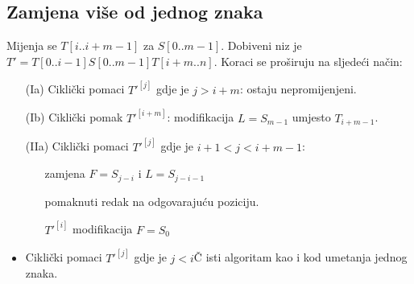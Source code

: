 \documentclass{ferseminar}
\begin{document}
\subsection{Zamjena više od jednog znaka}
Mijenja se $T[i..i+m-1]$ za $S[0..m-1]$. Dobiveni niz je $T'=T[0..i-1]S[0..m-1]T[i+m..n]$. Koraci se proširuju na sljedeći način:
\begin{itemize}
	\item[(Ia)] Ciklički pomaci $T'^{[j]}$ gdje je $j>i+m$: ostaju nepromijenjeni.
	\item[(Ib)] Ciklički pomak $T'^{[i+m]}$: modifikacija $L=S_{m-1}$ umjesto $T_{i+m-1}$.
	\item[(IIa)] Ciklički pomaci $T'^{[j]}$ gdje je $i+1<j<i+m-1$:
	\begin{itemize}
		\item[] zamjena $F=S_{j-i}$ i $L=S_{j-i-1}$
		\item[] pomaknuti redak na odgovarajuću poziciju.
		\item[$T'^{[i]}$] modifikacija $F=S_0$
	\end{itemize}
	\item Ciklički pomaci $T'^{[j]}$ gdje je $j<i$Č isti algoritam kao i kod umetanja jednog znaka.
\end{itemize}
\end{document}
